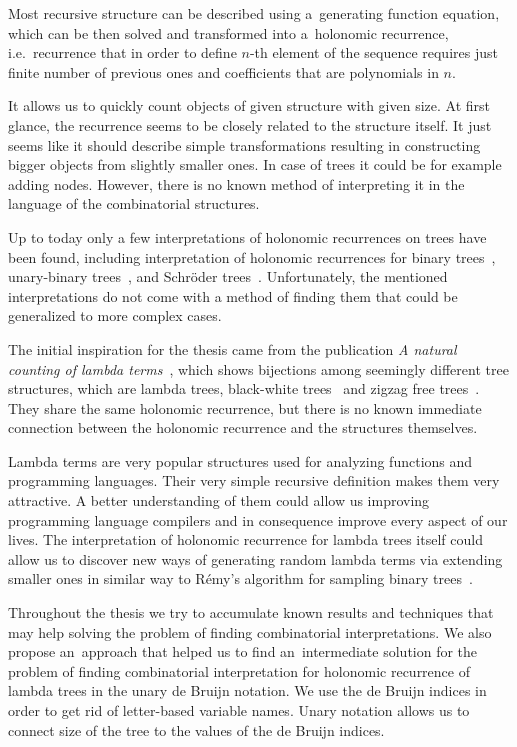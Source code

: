 \documentclass[final]{article}
\theoremstyle{definition}
\theoremstyle{definition}
\theoremstyle{remark}
\begin{document}
Most recursive structure can be described using a~generating function equation, which can be then solved and transformed into a~holonomic recurrence, i.e.~recurrence that in order to define \(n\)-th element of the sequence requires just finite number of previous ones and coefficients that are polynomials in \(n\).

It allows us to quickly count objects of given structure with given size. At first glance, the recurrence seems to be closely related to the structure itself. It just seems like it should describe simple transformations resulting in constructing bigger objects from slightly smaller ones. In case of trees it could be for example adding nodes. However, there is no known method of interpreting it in the language of the combinatorial structures.

Up to today only a few interpretations of holonomic recurrences on trees have been found, including interpretation of holonomic recurrences for binary trees~\cite{binary}, unary-binary trees~\cite{motzkin}, and Schröder trees~\cite{schroder}. Unfortunately, the mentioned interpretations do not come with a method of finding them that could be generalized to more complex cases.

The initial inspiration for the thesis came from the publication \textit{A natural counting of lambda terms}~\cite{inspiration}, which shows bijections among seemingly different tree structures, which are lambda trees, black-white trees~\cite{blackwhite} and zigzag free trees~\cite{inspiration}. They share the same holonomic recurrence, but there is no known immediate connection between the holonomic recurrence and the structures themselves.

Lambda terms are very popular structures used for analyzing functions and programming languages. Their very simple recursive definition makes them very attractive. A better understanding of them could allow us improving programming language compilers and in consequence improve every aspect of our lives. The interpretation of holonomic recurrence for lambda trees itself could allow us to discover new ways of generating random lambda terms via extending smaller ones in similar way to Rémy's algorithm for sampling binary trees~\cite{remy,note}.

Throughout the thesis we try to accumulate known results and techniques that may help solving the problem of finding combinatorial interpretations. We also propose an~approach that helped us to find an~intermediate solution for the problem of finding combinatorial interpretation for holonomic recurrence of lambda trees in the unary de Bruijn notation. We use the de Bruijn indices in order to get rid of letter-based variable names. Unary notation allows us to connect size of the tree to the values of the de Bruijn indices.
\end{document}
